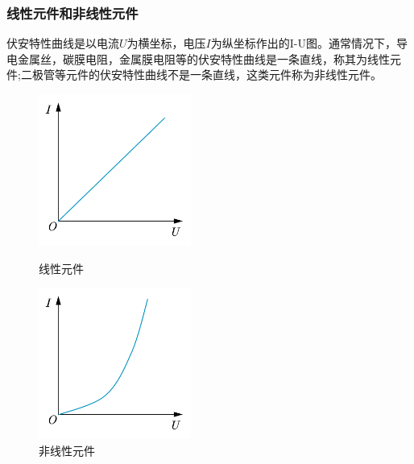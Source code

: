 \documentclass[12pt,a4paper,UTF8]{ctexart}
\begin{document}
	\subsubsection*{线性元件和非线性元件}
	\par 伏安特性曲线是以电流$U$为横坐标，电压$I$为纵坐标作出的I-U图。通常情况下，导电金属丝，碳膜电阻，金属膜电阻等的伏安特性曲线是一条直线，称其为线性元件;二极管等元件的伏安特性曲线不是一条直线，这类元件称为非线性元件。
	\vspace{0.2cm}
	\begin{figure}[htbp]
		\centering
		\begin{minipage}[t]{0.48\textwidth}
			\centering
			\includegraphics[width=5cm]{线性元件}
			\caption{线性元件}
		\end{minipage}
		\begin{minipage}[t]{0.48\textwidth}
			\centering
			\includegraphics[width=5cm]{非线性元件}
			\caption{非线性元件}
		\end{minipage}
	\end{figure}
	\vspace{-0.8cm}
\end{document}
